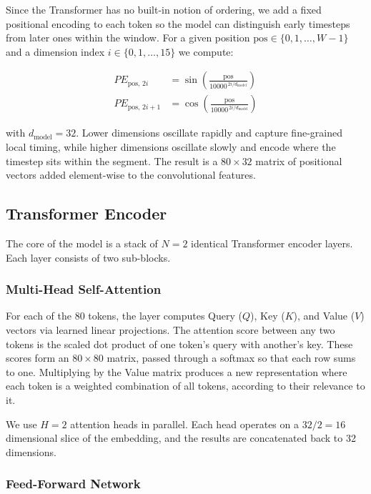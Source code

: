 \documentclass[11pt,a4paper,twocolumn]{article}
\begin{document}
Since the Transformer has no built-in notion of ordering, we add a fixed positional encoding to each token so the model can distinguish early timesteps from later ones within the window. For a given position $\text{pos} \in \{0, 1, \dots, W{-}1\}$ and a dimension index $i \in \{0, 1, \dots, 15\}$ we compute:

\begin{align}
PE_{\text{pos},\, 2i}   &= \sin\!\left(\frac{\text{pos}}{10000^{\,2i / d_{\text{model}}}}\right) \\[4pt]
PE_{\text{pos},\, 2i+1} &= \cos\!\left(\frac{\text{pos}}{10000^{\,2i / d_{\text{model}}}}\right)
\end{align}

with $d_{\text{model}} = 32$. Lower dimensions oscillate rapidly and capture fine-grained local timing, while higher dimensions oscillate slowly and encode where the timestep sits within the segment. The result is a $80 \times 32$ matrix of positional vectors added element-wise to the convolutional features.

\subsection{Transformer Encoder}

The core of the model is a stack of $N = 2$ identical Transformer encoder layers. Each layer consists of two sub-blocks.

\subsubsection{Multi-Head Self-Attention}

For each of the 80 tokens, the layer computes Query ($Q$), Key ($K$), and Value ($V$) vectors via learned linear projections. The attention score between any two tokens is the scaled dot product of one token's query with another's key. These scores form an $80 \times 80$ matrix, passed through a softmax so that each row sums to one. Multiplying by the Value matrix produces a new representation where each token is a weighted combination of all tokens, according to their relevance to it.

We use $H = 2$ attention heads in parallel. Each head operates on a $32/2 = 16$ dimensional slice of the embedding, and the results are concatenated back to 32 dimensions.

\subsubsection{Feed-Forward Network}
\end{document}
